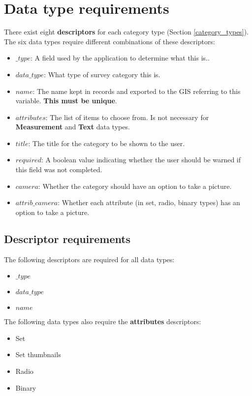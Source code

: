 \documentclass{scrreprt}
\begin{document}
\section{Data type requirements}
\label{descriptors}
There exist eight \textbf{descriptors} for each category type (Section \ref{category_types}). The six data types require different combinations of these descriptors:

\begin{itemize}
\item $\_type$:  A field used by the application to determine what this is..
\item $data\_type$: What type of survey category this is.
\item $name$: The name kept in records and exported to the GIS referring to this variable. \textbf{This must be unique}.
\item $attributes$: The list of items to choose from. Is not necessary for \textbf{Measurement} and \textbf{Text} data types.
\item $title$: The title for the category to be shown to the user.
\item $required$: A boolean value indicating whether the user should be warned if this field was not completed.
\item $camera$: Whether the category should have an option to take a picture.
\item $attrib\_camera$: Whether each attribute (in set, radio, binary types) has an option to take a picture.
\end{itemize}

\subsection{Descriptor requirements}
The following descriptors are required for all data types:
\begin{itemize}
\item $\_type$
\item $data\_type$
\item $name$
\end{itemize}

The following data types also require the \textbf{attributes} descriptors:
\begin{itemize}
\item Set
\item Set thumbnails
\item Radio
\item Binary
\end{itemize}
\end{document}
